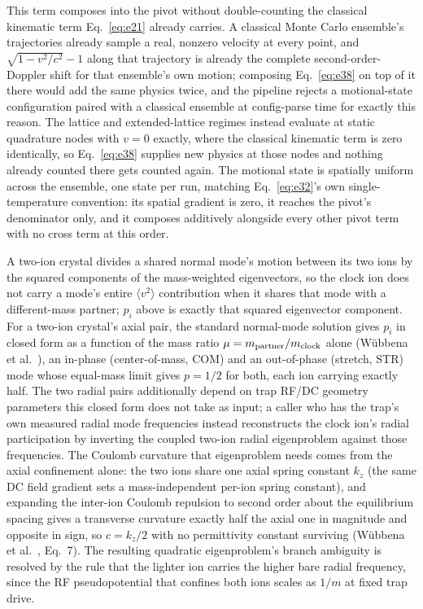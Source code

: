 \documentclass[aps,pra,superscriptaddress,groupedaddress,nofootinbib]{revtex4-2}
\begin{document}
This term composes into the pivot without double-counting the classical
kinematic term Eq.~\eqref{eq:e21} already carries. A classical Monte Carlo
ensemble's trajectories already sample a real, nonzero velocity at every
point, and $\sqrt{1-v^2/c^2}-1$ along that trajectory is already the
complete second-order-Doppler shift for that ensemble's own motion;
composing Eq.~\eqref{eq:e38} on top of it there would add the same physics
twice, and the pipeline rejects a motional-state configuration paired with a
classical ensemble at config-parse time for exactly this reason. The
lattice and extended-lattice regimes instead evaluate at static quadrature
nodes with $v=0$ exactly, where the classical kinematic term is zero
identically, so Eq.~\eqref{eq:e38} supplies new physics at those nodes and
nothing already counted there gets counted again. The motional state is spatially uniform across the ensemble, one state per
run, matching Eq.~\eqref{eq:e32}'s own single-temperature convention: its
spatial gradient is zero, it reaches the pivot's denominator only, and it
composes additively alongside every other pivot term with no cross term at
this order.

A two-ion crystal divides a shared normal mode's motion between its two ions
by the squared components of the mass-weighted eigenvectors, so the clock
ion does not carry a mode's entire $\langle v^2\rangle$ contribution when it
shares that mode with a different-mass partner; $p_i$ above is exactly that
squared eigenvector component. For a two-ion crystal's axial pair, the
standard normal-mode solution gives $p_i$ in closed form as a function of
the mass ratio $\mu=m_{\rm partner}/m_{\rm clock}$ alone
(W\"ubbena et al.~\cite{Wubbena2012}), an in-phase (center-of-mass, COM)
and an out-of-phase (stretch, STR) mode whose equal-mass limit gives
$p=1/2$ for both, each ion carrying exactly half. The two radial pairs additionally depend on trap RF/DC geometry
parameters this closed form does not take as input; a caller who has the
trap's own measured radial mode frequencies instead reconstructs the clock
ion's radial participation by inverting the coupled two-ion radial
eigenproblem against those frequencies. The Coulomb curvature that
eigenproblem needs comes from the axial confinement alone: the two ions
share one axial spring constant $k_z$ (the same DC field gradient sets a
mass-independent per-ion spring constant), and expanding the inter-ion
Coulomb repulsion to second order about the equilibrium spacing gives a
transverse curvature exactly half the axial one in magnitude and opposite in
sign, so $c=k_z/2$ with no permittivity constant surviving
(W\"ubbena et al.~\cite{Wubbena2012}, Eq.~7). The resulting quadratic
eigenproblem's branch ambiguity is resolved by the rule that the lighter ion
carries the higher bare radial frequency, since the RF pseudopotential that
confines both ions scales as $1/m$ at fixed trap drive.
\end{document}
